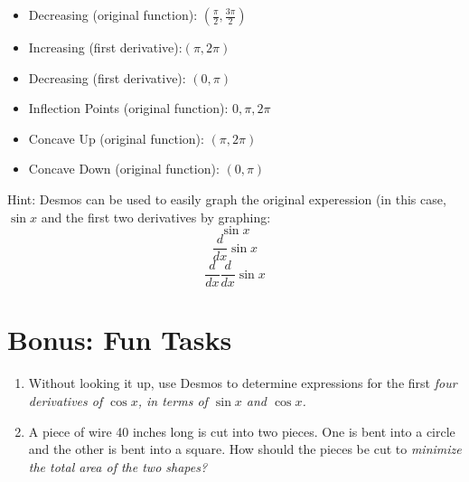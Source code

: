 \documentclass[11pt]{article}
\theoremstyle{definition}
\theoremstyle{remark}
\begin{document}
\begin{enumerate}[(a)]
{\begin{itemize}
    \item Decreasing (original function): $(\frac{\pi}{2}, \frac{3\pi}{2})$
    \item Increasing (first derivative):$(\pi, 2\pi)$
    \item Decreasing (first derivative): $(0, \pi)$
    \item Inflection Points (original function): $0, \pi, 2\pi$
    \item Concave Up (original function): $(\pi, 2\pi)$
    \item Concave Down (original function): $(0, \pi)$
\end{itemize}}
\end{enumerate}

Hint:  Desmos can be used to easily graph the original experession (in this case, $\sin x$ and the first two derivatives by graphing:
 	\[\sin x\]
    \[\frac{d}{dx}\sin x\]
    \[\frac{d}{dx}\frac{d}{dx}\sin x\]
    
\section*{Bonus: Fun Tasks}
\begin{enumerate}
\item Without looking it up, use Desmos to determine expressions for the first \em four \em derivatives of $\cos x$, in terms of $\sin x$ and $\cos x$.
\item A piece of wire 40 inches long is cut into two pieces.  One is bent into a circle and the other is bent into a square.  How should the pieces be cut to \em minimize \em the total area of the two shapes?
\end{enumerate}
\end{document}
